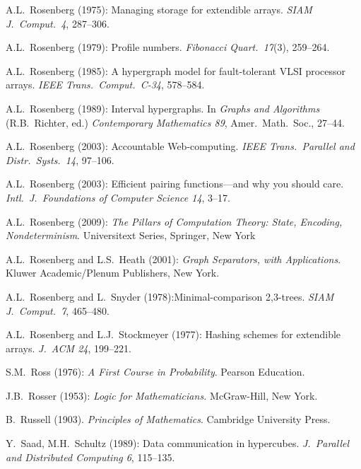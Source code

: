 \begin{thebibliography}{999}
A.L.~Rosenberg (1975): Managing storage for extendible arrays.  {\it
SIAM J.~Comput.~4}, 287--306.

A.L.~Rosenberg (1979): Profile numbers.  {\it Fibonacci Quart.~17}(3),
259--264.

A.L.~Rosenberg (1985): A hypergraph model for fault-tolerant VLSI
processor arrays.  {\it IEEE Trans.~Comput.~C-34}, 578--584.

A.L.~Rosenberg (1989): Interval hypergraphs.  In {\it Graphs and
  Algorithms} (R.B.~Richter, ed.) {\it Contemporary Mathematics 89},
Amer.~Math.~Soc., 27--44.

A.L.~Rosenberg (2003): Accountable Web-computing.  {\it IEEE
Trans.~Parallel and Distr.~Systs.~14}, 97--106.

A.L.~Rosenberg (2003): Efficient pairing functions---and why you
should care.  {\it Intl.~J.~Foundations of Computer Science 14},
3--17.

A.L.~Rosenberg (2009):
{\it The Pillars of Computation Theory: State, Encoding,
  Nondeterminism}.
Universitext Series, Springer, New York 

A.L.~Rosenberg and L.S.~Heath (2001):
{\it Graph Separators, with Applications}.
Kluwer Academic/Plenum Publishers, New York.

A.L.~Rosenberg and L.~Snyder (1978):Minimal-comparison 2,3-trees.
{\it SIAM J.~Comput.~7}, 465--480.


A.L.~Rosenberg and L.J.~Stockmeyer (1977): Hashing schemes for
extendible arrays.  {\it J.~ACM 24}, 199--221.

S.M.~Ross (1976):
{\it A First Course in Probability}.
Pearson Education.

J.B.~Rosser (1953):
{\it Logic for Mathematicians.}
McGraw-Hill, New York.

B.~Russell (1903).  {\it Principles of Mathematics}.
Cambridge University Press. 



Y.~Saad, M.H.~Schultz (1989):
Data communication in hypercubes.
{\it J.~Parallel and Distributed Computing 6}, 115--135.



\end{thebibliography}
